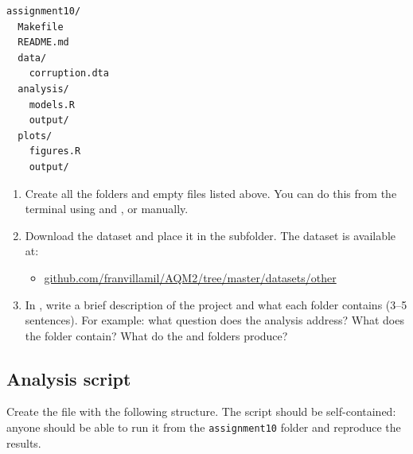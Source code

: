 \begin{lstlisting}
assignment10/
  Makefile
  README.md
  data/
    corruption.dta
  analysis/
    models.R
    output/
  plots/
    figures.R
    output/
\end{lstlisting}

\begin{enumerate}[label=\alph*)]
  \item Create all the folders and empty files listed above. You can do this from the terminal using  and , or manually.
  \item Download the  dataset and place it in the  subfolder. The dataset is available at:
  \begin{itemize}
    \item \href{https://github.com/franvillamil/AQM2/tree/master/datasets/other}{github.com/franvillamil/AQM2/tree/master/datasets/other}
  \end{itemize}
  \item In , write a brief description of the project and what each folder contains (3--5 sentences). For example: what question does the analysis address? What does the  folder contain? What do the  and  folders produce?
\end{enumerate}

\subsection{Analysis script}

Create the file  with the following structure. The script should be self-contained: anyone should be able to run it from the \texttt{assignment10} folder and reproduce the results.

